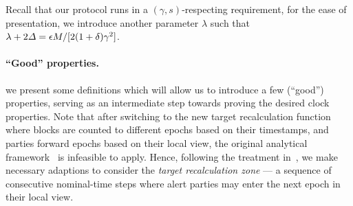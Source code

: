 Recall that our protocol runs in a $(\gamma, s)$-respecting requirement, for the ease of presentation, we introduce another parameter $\lambda$ such that $\lambda + 2 \varDelta = \epsilon M / [2 (1 + \delta) \gamma^2]$.

\paragraph{``Good'' properties.}
%
we present some definitions which will allow us to introduce a few
(“good”) properties, serving as an intermediate step towards proving the desired clock properties.
%
Note that after switching to the new target recalculation function where blocks are counted to different epochs based on their timestamps, and parties forward epochs based on their local view, the original analytical framework~\cite{C:GarKiaLeo17,EPRINT:GarKiaLeo20} is infeasible to apply.
%
Hence, following the treatment in~\cite{TCC:GarKiaShe22}, we make necessary adaptions to consider the \emph{target recalculation zone} --- a sequence of consecutive nominal-time steps where alert parties may enter the next epoch in their local view.

